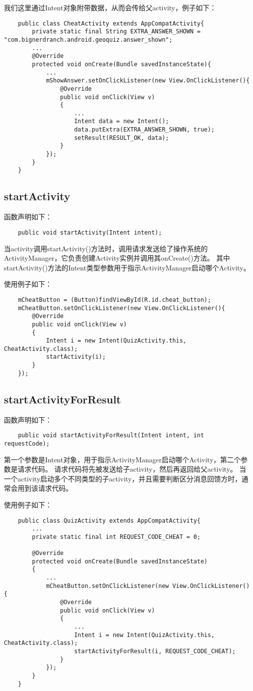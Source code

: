 \documentclass[a4paper,left=2.5cm,right=2.5cm,11pt]{article}
\begin{document}
	我们这里通过Intent对象附带数据，从而会传给父activity，例子如下：
	\begin{lstlisting}
	public class CheatActivity extends AppCompatActivity{
		private static final String EXTRA_ANSWER_SHOWN = "com.bignerdranch.android.geoquiz.answer_shown";
		...
		@Override
		protected void onCreate(Bundle savedInstanceState){
			...
			mShowAnswer.setOnClickListener(new View.OnClickListener(){
				@Override
				public void onClick(View v)
				{
					...
					Intent data = new Intent();
					data.putExtra(EXTRA_ANSWER_SHOWN, true);
					setResult(RESULT_OK, data);
				}
			});
		}
	}
	\end{lstlisting}

\subsection{startActivity}
	函数声明如下：
	\begin{lstlisting}
	public void startActivity(Intent intent);
	\end{lstlisting}

	当activity调用startActivity()方法时，调用请求发送给了操作系统的ActivityManager，它负责创建Activity实例并调用其onCreate()方法。
	其中startActivity()方法的Intent类型参数用于指示ActivityManager启动哪个Activity。

	使用例子如下：
	\begin{lstlisting}
	mCheatButton = (Button)findViewById(R.id.cheat_button);
	mCheatButton.setOnClickListener(new View.OnClickListener(){
		@Override
		public void onClick(View v)
		{
			Intent i = new Intent(QuizActivity.this, CheatActivity.class);
			startActivity(i);
		}
	});
	\end{lstlisting}

\subsection{startActivityForResult}
	函数声明如下：
	\begin{lstlisting}
	public void startActivityForResult(Intent intent, int requestCode);
	\end{lstlisting}

	第一个参数是Intent对象，用于指示ActivityManager启动哪个Activity，第二个参数是请求代码。
	请求代码将先被发送给子activity，然后再返回给父activity。
	当一个activity启动多个不同类型的子activity，并且需要判断区分消息回馈方时，通常会用到该请求代码。\par

	使用例子如下：
	\begin{lstlisting}
	public class QuizActivity extends AppCompatActivity{
		...
		private static final int REQUEST_CODE_CHEAT = 0;

		@Override
		protected void onCreate(Bundle savedInstanceState)
		{
			...
			mCheatButton.setOnClickListener(new View.OnClickListener(){
				@Override
				public void onClick(View v)
				{
					...
					Intent i = new Intent(QuizActivity.this, CheatActivity.class);
					startActivityForResult(i, REQUEST_CODE_CHEAT);
				}
			});
		}
	}
	\end{lstlisting}
\end{document}
